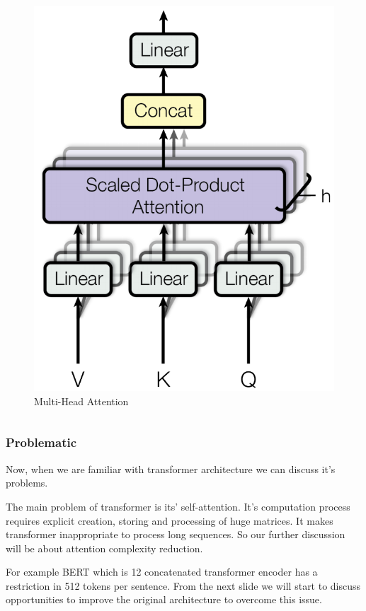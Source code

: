 \documentclass[9pt]{beamer}%
\begin{document}
\begin{frame}
\begin{columns}
\begin{figure}
			\includegraphics[scale=0.12]{MultiHeadAtt}
			\caption{Multi-Head Attention}
		\end{figure}
	\end{columns}
\end{frame}

\begin{frame}
	\frametitle{Problematic}
	
	Now, when we are familiar with transformer architecture we can discuss it's problems. 
	
	\begin{block}{}
		The main problem of transformer is its' self-attention. It's computation process requires explicit creation, storing and processing of huge matrices. It makes transformer inappropriate to process long sequences. So our further discussion will be about attention complexity reduction.
	\end{block}
	
	For example BERT which is 12 concatenated transformer encoder has a restriction in 512 tokens per sentence. From the next slide we will start to discuss opportunities to improve the original architecture to overcome this issue.
	
\end{frame}
\end{document}
